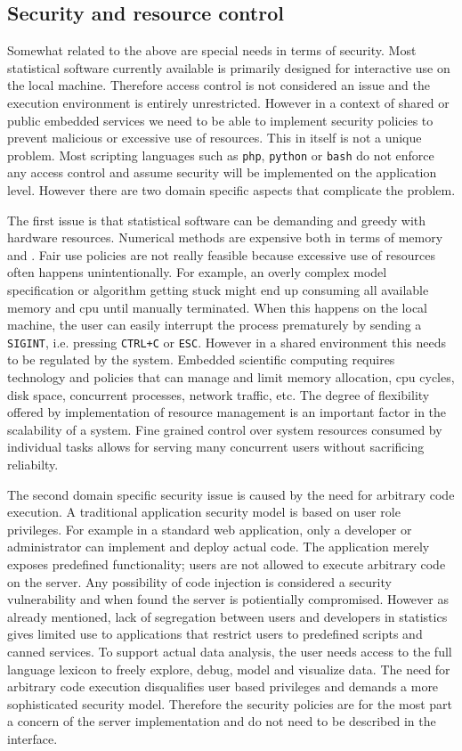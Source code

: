 \subsection{Security and resource control}

Somewhat related to the above are special needs in terms of security. Most statistical software currently available is primarily designed for interactive use on the local machine. Therefore access control is not considered an issue and the execution environment is entirely unrestricted. However in a context of shared or public embedded services we need to be able to implement security policies to prevent malicious or excessive use of resources. This in itself is not a unique problem. Most scripting languages such as \texttt{php}, \texttt{python} or \texttt{bash} do not enforce any access control and assume security will be implemented on the application level. However there are two domain specific aspects that complicate the problem. 

The first issue is that statistical software can be demanding and greedy with hardware resources. Numerical methods are expensive both in terms of memory and \CPU. Fair use policies are not really feasible because excessive use of resources often happens unintentionally. For example, an overly complex model specification or algorithm getting stuck might end up consuming all available memory and cpu until manually terminated. When this happens on the local machine, the user can easily interrupt the process prematurely by sending a \texttt{SIGINT}, i.e. pressing \texttt{CTRL+C} or \texttt{ESC}. However in a shared environment this needs to be regulated by the system. Embedded scientific computing requires technology and policies that can manage and limit memory allocation, cpu cycles, disk space, concurrent processes, network traffic, etc. The degree of flexibility offered by implementation of resource management is an important factor in the scalability of a system. Fine grained control over system resources consumed by individual tasks allows for serving many concurrent users without sacrificing reliabilty. 

The second domain specific security issue is caused by the need for arbitrary code execution. A traditional application security model is based on user role privileges. For example in a standard web application, only a developer or administrator can implement and deploy actual code. The application merely exposes predefined functionality; users are not allowed to execute arbitrary code on the server. Any possibility of code injection is considered a security vulnerability and when found the server is potientially compromised. However as already mentioned, lack of segregation between users and developers in statistics gives limited use to applications that restrict users to predefined scripts and canned services. To support actual data analysis, the user needs access to the full language lexicon to freely explore, debug, model and visualize data. The need for arbitrary code execution disqualifies user based privileges and demands a more sophisticated security model. Therefore the security policies are for the most part a concern of the server implementation and do not need to be described in the interface.


